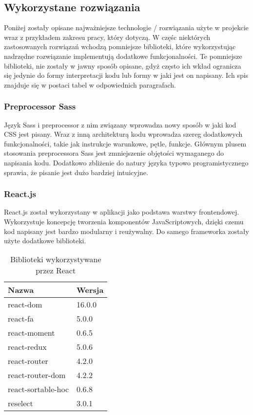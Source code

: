 \documentclass[eng,printmode]{mgr}
\begin{document}
\subsection{Wykorzystane rozwiązania}

Poniżej zostały opisane najważniejsze technologie / rozwiązania użyte w projekcie wraz z przykładem zakresu pracy, który dotyczą. W częśc niektórych zastosowanych rozwiązań wchodzą pomniejsze biblioteki, które wykorzystując nadrzędne rozwiązanie implementują dodatkowe funkcjonalności. Te pomniejsze biblioteki, nie zostały w jawny sposób opisane, gdyż często ich wkład ogranicza się jedynie do formy interpretacji kodu lub formy w jaki jest on napisany. Ich spis znajduje się w postaci tabel w odpowiednich paragrafach.

\subsubsection{Preprocessor Sass}
Język Sass i preprocessor z nim związany \cite {Sass} wprowadza nowy sposób w jaki kod CSS jest pisany. Wraz z inną architekturą kodu wprowadza szereg dodatkowych funkcjonalności, takie jak instrukcje warunkowe, pętle, funkcje. Głównym plusem stosowania preprocessora Sass jest zmniejszenie objętości wymaganego do napisania kodu. Dodatkowo zbliżenie do natury języka typowo programistycznego sprawia, że pisanie jest dużo bardziej intuicyjne.

\subsubsection{React.js}
React.js \cite {React} został wykorzystany w aplikacji jako podstawa warstwy frontendowej. Wykorzystuje koncepcję tworzenia komponentów JavaScriptowych, dzięki czemu kod napisany jest bardzo modularny i reużywalny. Do samego frameworka zostały użyte dodatkowe biblioteki.

\begin{table}[H]
\begin{tabularx}{\textwidth}{|X|X|}
  \hline
    \textbf{Nazwa} & \textbf{Wersja} \\
  \hline
   	react-dom & 16.0.0 \\
  \hline
  	react-fa & 5.0.0 \\
   \hline
   	react-moment & 0.6.5 \\
   \hline
  	react-redux & 5.0.6 \\
   \hline
  	react-router & 4.2.0 \\
   \hline
  	react-router-dom & 4.2.2 \\
   \hline
  	react-sortable-hoc & 0.6.8 \\
   \hline
   reselect & 3.0.1 \\
   \hline
\end{tabularx}
\caption{Biblioteki wykorzystywane przez React}
\end{table}
\end{document}
